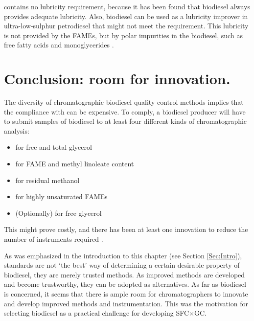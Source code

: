  contains no lubricity requirement, because it has been found
that biodiesel always provides adequate lubricity. Also, biodiesel can be used
as a lubricity improver in ultra-low-sulphur petrodiesel that might not meet the
requirement. This lubricity is not provided by the FAMEs, but by polar
impurities in the biodiesel, such as free fatty acids and monoglycerides
\autocite{Knothe2005}.

\section{Conclusion: room for innovation.}

The diversity of chromatographic biodiesel quality control methods implies that
the compliance with  can be expensive. To comply, a biodiesel
producer will have to submit samples of biodiesel to at least four different
kinds of chromatographic analysis:

\begin{itemize}
  \item {} for free and total glycerol
  \item {} for FAME and methyl linoleate content
  \item {} for residual methanol 
  \item {} for highly unsaturated FAMEs
  \item (Optionally)  for free glycerol
\end{itemize}

This might prove costly, and there has been at least one innovation to reduce
the number of instruments required \autocite{McCurry2009}.

As was emphasized in the introduction to this chapter (see Section
\ref{Sec:Intro}), standards are not `the best' way of determining a certain
desirable property of biodiesel, they are merely trusted methods. As improved
methods are developed and become trustworthy, they can be adopted as
alternatives. As far as biodiesel is concerned, it seems that there is ample
room for chromatographers to innovate and develop improved methods and
instrumentation. This was the motivation for selecting biodiesel as a practical
challenge for developing SFC×GC.